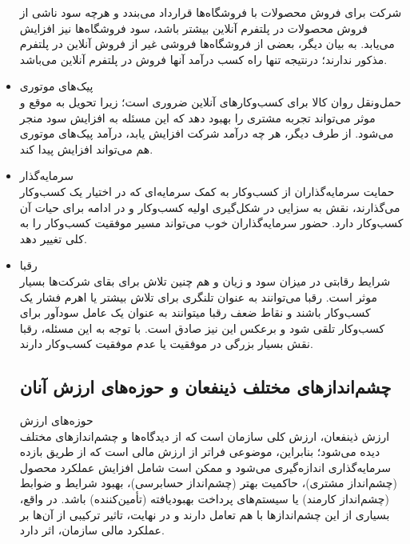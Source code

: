 \documentclass[14pt]{article}
\begin{document}
\begin{flushright}
\begin{itemize}
شرکت برای فروش محصولات با فروشگاه‌ها قرارداد می‌بندد و هرچه سود ناشی از فروش محصولات در پلتفرم آنلاین بیشتر باشد، سود فروشگاه‌ها نیز افزایش می‌یابد. به بیان دیگر، بعضی از فروشگاه‌ها فروشی غیر از فروش آنلاین در پلتفرم مذکور ندارند؛ درنتیجه تنها راه کسب درآمد آنها فروش در پلتفرم آنلاین می‌باشد.\\
\item پیک‌های موتوری\\ 
حمل‌و‌نقل روان کالا برای کسب‌وکار‌های آنلاین ضروری است؛ زیرا تحویل به موقع و موثر می‌تواند تجربه مشتری را بهبود دهد که این مسئله به افزایش سود منجر می‌شود. از طرف دیگر، هر چه درآمد شرکت افزایش یابد، درآمد پیک‌های موتوری هم می‌تواند افزایش پیدا کند.\\
\item سرمایه‌گذار\\
حمایت سرمایه‌گذاران از کسب‌وکار به کمک سرمایه‌ای که در اختیار یک کسب‌وکار می‌گذارند،‌ نقش به سزایی در شکل‌گیری اولیه کسب‌وکار و در ادامه برای حیات آن کسب‌وکار دارد. حضور سرمایه‌گذاران خوب می‌تواند مسیر موفقیت کسب‌وکار را به کلی تغییر دهد.\\
\item رقبا\\
شرایط رقابتی در میزان سود و زیان و هم چنین تلاش برای بقای شرکت‌ها بسیار موثر است. رقبا می‌توانند به عنوان تلنگری برای تلاش بیشتر یا اهرم فشار یک کسب‌وکار باشند و نقاط ضعف رقبا میتوانند به عنوان یک عامل سود‌آور برای کسب‌وکار تلقی شود و برعکس این نیز صادق است. با توجه به این مسئله، رقبا نقش بسیار بزرگی در موفقیت یا عدم موفقیت کسب‌وکار دارند.\\




\subsection{چشم‌اندازهای مختلف ذینفعان و حوزه‌های ارزش آنان}

حوزه‌های ارزش\\

ارزش ذینفعان، ارزش کلی سازمان است که از دیدگاه‌ها و چشم‌اندازهای مختلف دیده می‌شود؛ بنابراین، موضوعی فراتر از ارزش مالی است که از طریق بازده سرمایه‌گذاری اندازه‌گیری می‌شود و ممکن است شامل افزایش عملکرد محصول (چشم‌انداز مشتری)، حاکمیت بهتر (چشم‌انداز حسابرسی)، بهبود شرایط و ضوابط (چشم‌انداز کارمند) یا سیستم‌های پرداخت بهبود‌یافته (تأمین‌کننده) باشد. در واقع، بسیاری از این چشم‌اندازها با هم تعامل دارند و در نهایت، تاثیر ترکیبی از آن‌ها بر عملکرد مالی سازمان، اثر دارد.\\


\end{itemize}
\end{flushright}
\end{document}
